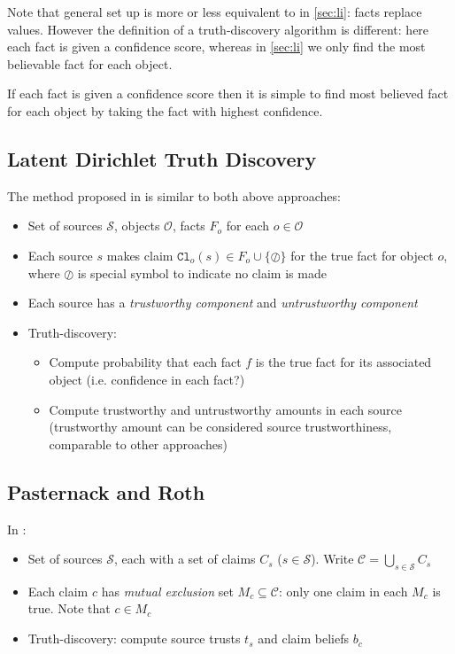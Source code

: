 \documentclass{article}
\theoremstyle{definition} \newtheorem{definition}{Definition}
\theoremstyle{definition} \newtheorem{example}{Example}
\theoremstyle{plain} \newtheorem{axiom}{Axiom}
\theoremstyle{plain} \newtheorem*{remark}{Remark}
\theoremstyle{remark} \newtheorem*{notation}{Notation}
\theoremstyle{plain} \newtheorem{lemma}{Lemma}
\theoremstyle{plain} \newtheorem{theorem}{Theorem}
\theoremstyle{plain} \newtheorem{proposition}{Proposition}
\renewcommand{\S}{\mathcal{S}}  %
\renewcommand{\O}{\mathcal{O}}  %
\begin{document}
Note that general set up is more or less equivalent to in \ref{sec:li}: facts
replace values. However the definition of a truth-discovery algorithm is
different: here each fact is given a confidence score, whereas in \ref{sec:li}
we only find the most believable fact for each object.

If each fact is given a confidence score then it is simple to find most
believed fact for each object by taking the fact with highest confidence.

\subsection{Latent Dirichlet Truth Discovery}
\label{sec:ldt}

The method proposed in \cite{zhang_qi_tang} is similar to both above approaches:

\begin{itemize}
\item Set of sources $\S$, objects $\O$, facts $F_o$ for each $o \in \O$
\item Each source $s$ makes claim $\texttt{Cl}_o(s) \in F_o \cup
\{\oslash\}$ for the true fact for object $o$, where $\oslash$ is special
symbol to indicate no claim is made
\item Each source has a \emph{trustworthy component} and \emph{untrustworthy
component}
\item Truth-discovery:
    \begin{itemize}
    \item Compute probability that each fact $f$ is the true fact for its
    associated object (i.e. confidence in each fact?)
    \item Compute trustworthy and untrustworthy amounts in each source
    (trustworthy amount can be considered source trustworthiness, comparable to
    other approaches)
    \end{itemize}
\end{itemize}

\subsection{Pasternack and Roth}
\label{sec:past}

In \cite{pasternack}:

\begin{itemize}
\item Set of sources $\S$, each with a set of claims $C_s$ ($s \in \S$). Write
$\mathcal{C} = \bigcup_{s \in \S}{C_s}$
\item Each claim $c$ has \emph{mutual exclusion} set $M_c \subseteq
\mathcal{C}$: only one claim in each $M_c$ is true. Note that $c \in M_c$
\item Truth-discovery: compute source trusts $t_s$ and claim beliefs $b_c$
\end{itemize}
\end{document}

